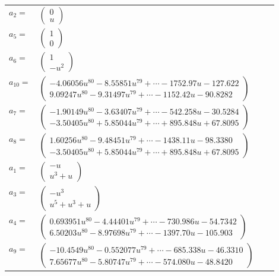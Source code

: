 \documentclass[1p]{elsarticle_modified}
\theoremstyle{definition}
\begin{document}
\begin{tabular}{m{7pt} m{180pt} m{7pt} m{180pt} }
\flushright $a_{2}=$&$\begin{pmatrix}0\\u\end{pmatrix}$ \\
\flushright $a_{5}=$&$\begin{pmatrix}1\\0\end{pmatrix}$ \\
\flushright $a_{6}=$&$\begin{pmatrix}1\\- u^2\end{pmatrix}$ \\
\flushright $a_{10}=$&$\begin{pmatrix}-4.06056 u^{80}-8.55851 u^{79}+\cdots-1752.97 u-127.622\\9.09247 u^{80}-9.31497 u^{79}+\cdots-1152.42 u-90.8282\end{pmatrix}$ \\
\flushright $a_{7}=$&$\begin{pmatrix}-1.90149 u^{80}-3.63407 u^{79}+\cdots-542.258 u-30.5284\\-3.50405 u^{80}+5.85044 u^{79}+\cdots+895.848 u+67.8095\end{pmatrix}$ \\
\flushright $a_{8}=$&$\begin{pmatrix}1.60256 u^{80}-9.48451 u^{79}+\cdots-1438.11 u-98.3380\\-3.50405 u^{80}+5.85044 u^{79}+\cdots+895.848 u+67.8095\end{pmatrix}$ \\
\flushright $a_{1}=$&$\begin{pmatrix}- u\\u^3+u\end{pmatrix}$ \\
\flushright $a_{3}=$&$\begin{pmatrix}- u^3\\u^5+u^3+u\end{pmatrix}$ \\
\flushright $a_{4}=$&$\begin{pmatrix}0.693951 u^{80}-4.44401 u^{79}+\cdots-730.986 u-54.7342\\6.50203 u^{80}-8.97698 u^{79}+\cdots-1397.70 u-105.903\end{pmatrix}$ \\
\flushright $a_{9}=$&$\begin{pmatrix}-10.4549 u^{80}-0.552077 u^{79}+\cdots-685.338 u-46.3310\\7.65677 u^{80}-5.80747 u^{79}+\cdots-574.080 u-48.8420\end{pmatrix}$ \\

\end{tabular}
\end{document}
